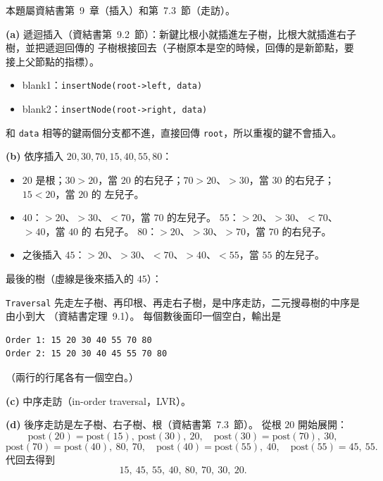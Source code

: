 \begin{pastsoln}
本題屬資結書第~9~章（插入）和第~7.3~節（走訪）。

\textbf{(a)} 遞迴插入（資結書第~9.2~節）：新鍵比根小就插進左子樹，比根大就插進右子樹，並把遞迴回傳的
子樹根接回去（子樹原本是空的時候，回傳的是新節點，要接上父節點的指標）。
\begin{itemize}
\item blank1：\texttt{insertNode(root->left, data)}
\item blank2：\texttt{insertNode(root->right, data)}
\end{itemize}
和 \texttt{data} 相等的鍵兩個分支都不進，直接回傳 \texttt{root}，所以重複的鍵不會插入。

\textbf{(b)} 依序插入 $20, 30, 70, 15, 40, 55, 80$：
\begin{itemize}
\item $20$ 是根；$30 > 20$，當 $20$ 的右兒子；$70 > 20$、$> 30$，當 $30$ 的右兒子；$15 < 20$，當 $20$ 的
左兒子。
\item $40$：$> 20$、$> 30$、$< 70$，當 $70$ 的左兒子。 $55$：$> 20$、$> 30$、$< 70$、$> 40$，當 $40$ 的
右兒子。 $80$：$> 20$、$> 30$、$> 70$，當 $70$ 的右兒子。
\item 之後插入 $45$：$> 20$、$> 30$、$< 70$、$> 40$、$< 55$，當 $55$ 的左兒子。
\end{itemize}
最後的樹（虛線是後來插入的 $45$）：
\begin{center}
\end{center}
\texttt{Traversal} 先走左子樹、再印根、再走右子樹，是中序走訪，二元搜尋樹的中序是由小到大
（資結書定理~9.1）。 每個數後面印一個空白，輸出是
\begin{verbatim}
Order 1: 15 20 30 40 55 70 80 
Order 2: 15 20 30 40 45 55 70 80 
\end{verbatim}
（兩行的行尾各有一個空白。）

\textbf{(c)} 中序走訪（in-order traversal，LVR）。

\textbf{(d)} 後序走訪是左子樹、右子樹、根（資結書第~7.3~節）。 從根 $20$ 開始展開：
\[
\text{post}(20) = \text{post}(15),\ \text{post}(30),\ 20,\quad
\text{post}(30) = \text{post}(70),\ 30,
\]
\[
\text{post}(70) = \text{post}(40),\ 80,\ 70,\quad
\text{post}(40) = \text{post}(55),\ 40,\quad
\text{post}(55) = 45,\ 55 .
\]
代回去得到
\[
15,\ 45,\ 55,\ 40,\ 80,\ 70,\ 30,\ 20 .
\]
\end{pastsoln}

